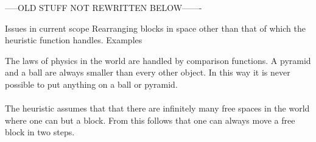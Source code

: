 
-----OLD STUFF NOT REWRITTEN BELOW-------

Issues in current scope
    Rearranging blocks in space other than that of which the 
    heuristic function handles.
        Examples

The laws of physics in the world are handled by comparison functions. A pyramid
and a ball are always smaller than every other object. In this way it is never
possible to put anything on a ball or pyramid. 
\\\\
The heuristic assumes that that there are infinitely many free spaces in the
world where one can but a block. From this follows that one can always move a
free block in two steps. 








